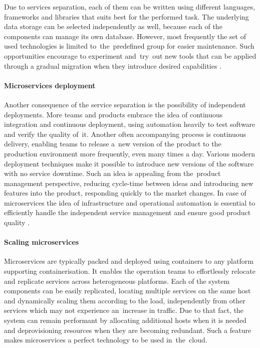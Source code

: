 Due to services separation, each of them can be written using different languages, frameworks and libraries that suits best for the performed task. The underlying data storage can be selected independently as well, because each of the components can manage its own database. However, most frequently the set of used technologies is limited to~the~predefined group for easier maintenance. Such opportunities encourage to experiment and~try~out new tools that can be applied through a gradual migration when they introduce desired capabilities \cite{FowlerMicroservicesTradeoffs}.

\paragraph{Microservices deployment}

Another consequence of the service separation is the possibility of independent deployments. More teams and products embrace the idea of continuous integration and continuous deployment, using automation heavily to test software and verify the quality of~it. Another often accompanying process is continuous delivery, enabling teams to release a~new version of the product to the production environment more frequently, even many times a day. Various modern deployment techniques make it possible to introduce new versions of the software with no service downtime. Such an idea is appealing from the~product management perspective, reducing cycle-time between ideas and introducing new features into the product, responding quickly to the market changes. In case of microservices the idea of infrastructure and operational automation is essential to efficiently handle the independent service management and ensure good product quality \cite{FowlerMicroservicesTradeoffs}.

\paragraph{Scaling microservices}

Microservices are typically packed and deployed using containers to any platform supporting containerisation. It enables the operation teams to effortlessly relocate and replicate services across heterogeneous platforms. Each of the system components can be easily replicated, locating multiple services on the same host and dynamically scaling them according to the load, independently from other services which may not experience an~increase in traffic. Due to that fact, the system can remain performant by allocating additional hosts when it is needed and deprovisioning resources when they are becoming redundant. Such a feature makes microservices a perfect technology to be used in~the~cloud.

